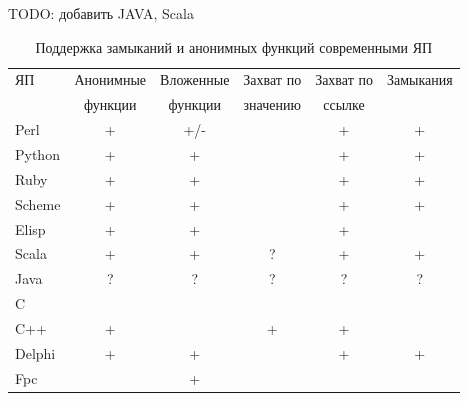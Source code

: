 \documentclass{imcs}
\begin{document}
TODO: добавить JAVA, Scala
\begin{table}[h!]
\begin{center}
\begin{tabular}{|l|c|c|c|c|c|}
\hline
  ЯП     &  Анонимные  &  Вложенные  &  Захват по  &  Захват по  &  Замыкания  \\
         &  функции    &  функции    &  значению   &  ссылке     &             \\
\hline
 Perl    &  +          &  +/-        &             &  +          &  +          \\
\hline
 Python  &  +          &  +          &             &  +          &  +          \\
\hline
 Ruby    &  +          &  +          &             &  +          &  +          \\
\hline
 Scheme  &  +          &  +          &             &  +          &  +          \\
\hline
 Elisp   &  +          &  +          &             &  +          &             \\
\hline
 Scala   &  +          &  +          &  ?          &  +          &  +          \\
\hline
 Java    &  ?          &  ?          &  ?          &  ?          &  ?          \\
\hline
 C       &             &             &             &             &             \\
\hline
 C++     &  +          &             &  +          &  +          &             \\
\hline
 Delphi  &  +          &  +          &             &  +          &  +          \\
\hline
 Fpc     &             &  +          &             &             &             \\
\hline
\end{tabular}
\caption{Поддержка замыканий и анонимных функций современными ЯП}\label{tab:wsi_diff_rel}
\end{center}
\end{table}

\pagebreak
\end{document}
